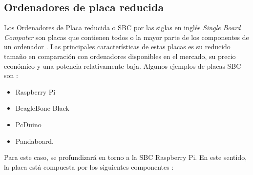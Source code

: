 \subsection{Ordenadores de placa reducida}

Los Ordenadores de Placa reducida o SBC por las siglas en inglés \textit{Single Board Computer} son placas que contienen todos o la mayor parte de los componentes de un ordenador \parencite{garcia2014}. Las principales características de estas placas es su reducido tamaño en comparación con ordenadores disponibles en el mercado, su precio económico y una potencia relativamente baja. Algunos ejemplos de placas SBC son \parencite{garcia2014}:
\begin{itemize}
\item Raspberry Pi
\item BeagleBone Black
\item PcDuino
\item Pandaboard.
\end{itemize}

Para este caso, se profundizará en torno a la SBC Raspberry Pi. En este sentido, la placa está compuesta por los siguientes componentes \parencite{gareth2018}:

